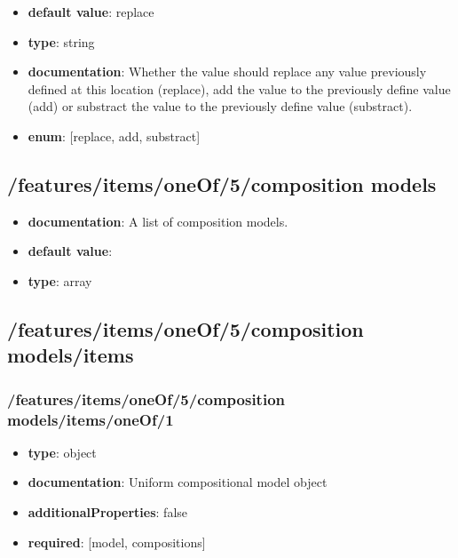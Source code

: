 \begin{itemize}\item {\bf default value}: replace
\item {\bf type}: string
\item {\bf documentation}: Whether the value should replace any value previously defined at this location (replace), add the value to the previously define value (add) or substract the value to the previously define value (substract).
\item {\bf enum}: [replace, add, substract]\end{itemize}\subsection{/features/items/oneOf/5/composition models}
\begin{itemize}\item {\bf documentation}: A list of composition models.
\item {\bf default value}: 
\item {\bf type}: array
\end{itemize}\subsection{/features/items/oneOf/5/composition models/items}

\subsubsection{/features/items/oneOf/5/composition models/items/oneOf/1}
\begin{itemize}\item {\bf type}: object
\item {\bf documentation}: Uniform compositional model object
\item {\bf additionalProperties}: false
\item {\bf required}: [model, compositions]\end{itemize}
